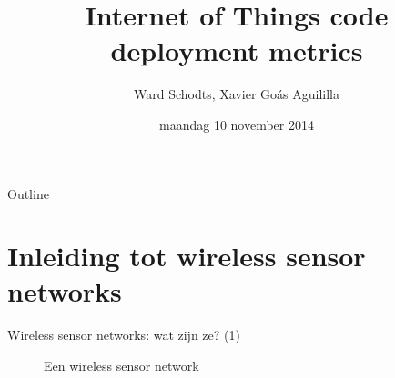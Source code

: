 \documentclass[presentation, bigger]{beamer}
\author{Ward Schodts, Xavier Goás Aguililla}
\date{maandag 10 november 2014}
\title{Internet of Things code deployment metrics}
\begin{document}
\maketitle
\begin{frame}[noframenumbering]{Outline}
\tableofcontents
\end{frame}



\section{Inleiding tot wireless sensor networks}
\label{sec-1}
\begin{frame}[label=sec-1-1]{Wireless sensor networks: wat zijn ze? (1)}

\begin{figure}
\caption{Een wireless sensor network}
\end{figure}

\end{frame}
\end{document}
